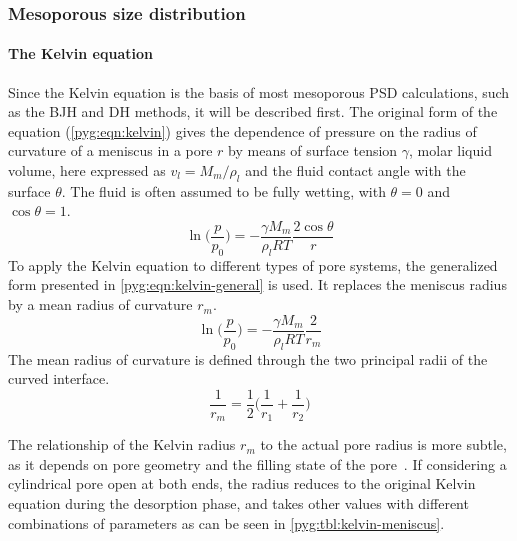 \subsubsection{Mesoporous size distribution}

\paragraph{The Kelvin equation}

Since the Kelvin equation is the basis of most mesoporous PSD
calculations, such as the BJH and DH methods, it will be described
first. The original form of the equation (\autoref{pyg:eqn:kelvin})
gives the dependence of pressure on the radius of curvature of a
meniscus in a pore \(r\) by means of surface tension \( \gamma \),
molar liquid volume, here expressed as \(v_l=M_m/\rho_l\) and the
fluid contact angle with the surface
\( \theta \). The fluid is often assumed to be fully wetting, with
\(\theta=0\) and \(\cos\theta=1\).
%
\begin{equation}\label{pyg:eqn:kelvin}
	\ln\Big(\frac{p}{p_0}\Big) = -\frac{\gamma M_m}{\rho_l RT}\frac{2 \cos\theta}{r}
\end{equation}
%
To apply the Kelvin equation to different types of pore systems, the
generalized form presented in \autoref{pyg:eqn:kelvin-general}
is used. It replaces the meniscus radius by a mean radius of curvature
\(r_m\).
%
\begin{equation}\label{pyg:eqn:kelvin-general}
	\ln\Big(\frac{p}{p_0}\Big) = -\frac{\gamma M_m}{\rho_l RT}\frac{2}{r_m}
\end{equation}
%
The mean radius of curvature is defined through the two principal
radii of the curved interface.
%
\begin{equation}\label{pyg:eqn:kelvin-mradius}
	\frac{1}{r_m} = \frac{1}{2}\Big(\frac{1}{r_1}+\frac{1}{r_2}\Big)
\end{equation}

The relationship of the Kelvin radius \(r_m\) to the actual pore
radius is more subtle, as it depends on pore geometry and the
filling state of the pore~\cite{doAdsorptionAnalysisEquilibria1998}.
If considering a cylindrical pore open at both ends, the radius reduces
to the original Kelvin equation during the desorption phase, and takes
other values with different combinations of parameters
as can be seen in \autoref{pyg:tbl:kelvin-meniscus}.

